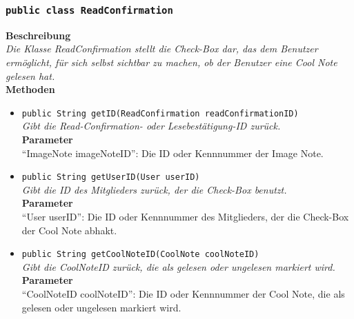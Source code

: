 \subsubsection{\texttt{public class ReadConfirmation}}

	\textbf{Beschreibung} \\
	\textit{Die Klasse ReadConfirmation stellt die Check-Box dar, das dem Benutzer ermöglicht, für sich selbst sichtbar zu machen, ob der Benutzer eine Cool Note gelesen hat.} \\
	
	\textbf{Methoden}
	\begin{itemize}
		\item\texttt{{public String getID(ReadConfirmation readConfirmationID)}}\\
		\textit{Gibt die Read-Confirmation- oder Lesebestätigung-ID zurück.}\\
		\textbf{Parameter}\\
		“ImageNote imageNoteID”: Die ID oder Kennnummer der Image Note.\\
		
		\item\texttt{{public String getUserID(User userID)}}\\
		\textit{Gibt die ID des Mitglieders zurück, der die Check-Box benutzt.}\\
		\textbf{Parameter}\\
		“User userID”: Die ID oder Kennnummer des Mitglieders, der die Check-Box der Cool Note abhakt.\\
		
		\item\texttt{{public String getCoolNoteID(CoolNote coolNoteID)}}\\
		\textit{Gibt die CoolNoteID zurück, die als gelesen oder ungelesen markiert wird.}\\
		\textbf{Parameter}\\
		“CoolNoteID coolNoteID”: Die ID oder Kennnummer der Cool Note, die als gelesen oder ungelesen markiert wird.\\
	\end{itemize}

